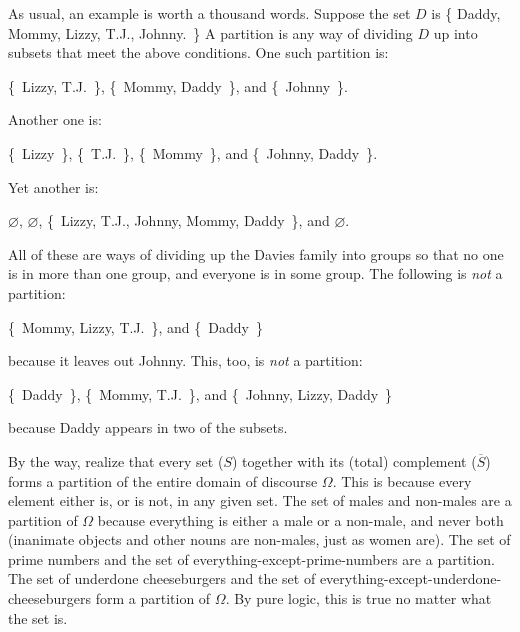 As usual, an example is worth a thousand words. 
Suppose the set $D$ is \{ Daddy, Mommy, Lizzy, T.J., Johnny.~\} A
partition is any way of dividing $D$ up into subsets that meet the above
conditions. One such partition is:

\begin{center}
\{~Lizzy, T.J.~\},
\{~Mommy, Daddy~\}, and
\{~Johnny~\}.
\end{center}

Another one is:

\begin{center}
\{~Lizzy~\},
\{~T.J.~\},
\{~Mommy~\}, and
\{~Johnny, Daddy~\}.
\end{center}

Yet another is:

\begin{center}
$\varnothing$,
$\varnothing$,
\{~Lizzy, T.J., Johnny, Mommy, Daddy~\}, and
$\varnothing$.
\end{center}

All of these are ways of dividing up the Davies family into groups so that
no one is in more than one group, and everyone is in some group. The
following is \textit{not} a partition:

\begin{center}
\{~Mommy, Lizzy, T.J.~\}, and
\{~Daddy~\}
\end{center}

because it leaves out Johnny. This, too, is \textit{not} a partition:

\begin{center}
\{~Daddy~\}, 
\{~Mommy, T.J.~\}, and
\{~Johnny, Lizzy, Daddy~\}
\end{center}

because Daddy appears in two of the subsets.

By the way, realize that every set ($S$) together with its (total)
complement ($\overline{S}$) forms a partition of the entire domain of
discourse $\Omega$.  This is because
every element either is, or is not, in any given set. The set of males and
non-males are a partition of $\Omega$ because everything is either a male
or a non-male, and never both (inanimate objects and other nouns are
non-males, just as women are). The set of prime numbers and the set of
everything-except-prime-numbers are a partition. The set of underdone
cheeseburgers and the set of everything-except-underdone-cheeseburgers form
a partition of $\Omega$.  By pure logic, this is true no matter what the
set is.

